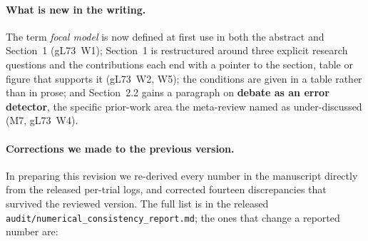 \documentclass[11pt]{article}
\begin{document}
\paragraph{What is new in the writing.}
The term \emph{focal model} is now defined at first use in both the abstract
and Section~1 (gL73~W1); Section~1 is restructured around three explicit
research questions and the contributions each end with a pointer to the
section, table or figure that supports it
(gL73~W2, W5); the conditions are given in a table rather than in prose; and
Section~2.2 gains a paragraph on \textbf{debate as an error detector}, the
specific prior-work area the meta-review named as under-discussed (M7,
gL73~W4).

\paragraph{Corrections we made to the previous version.}
In preparing this revision we re-derived every number in the manuscript
directly from the released per-trial logs, and corrected fourteen
discrepancies that survived the reviewed version. The full list is in the
released \texttt{audit/numerical\_consistency\_report.md}; the ones that change
a reported number are:
\end{document}
